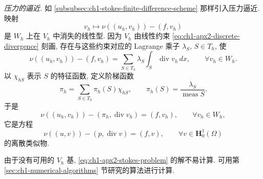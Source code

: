 \emph{压力的逼近.} 如 \ref{subsubsec:ch1-stokes-finite-difference-scheme} 那样引入压力逼近. 映射
\[
v_h\longmapsto\nu((u_h,v_h))-(f,v_h)
\]
是 $W_h$ 上在 $V_h$ 中消失的线性型. 因为 $V_h$ 由线性约束 \eqref{eq:ch1-apx2-discrete-divergence} 刻画, 存在与这些约束对应的 Lagrange 乘子 $\lambda_S$, $S\in T_h$, 使
\begin{equation}
\nu((u_h,v_h))-(f,v_h)
=\sum_{S\in T_h}\lambda_S\int_S\operatorname{div}v_h\,dx,
\qquad\forall v_h\in W_h.
\label{eq:ch1-apx2-pressure-multipliers}
\end{equation}
以 $\chi_{hS}$ 表示 $S$ 的特征函数, 定义阶梯函数
\begin{equation}
\pi_h=\sum_{S\in T_h}\pi_h(S)\chi_{hS},
\qquad
\pi_h(S)=\frac{\lambda_S}{\operatorname{meas}S}.
\label{eq:ch1-apx2-discrete-pressure}
\end{equation}
于是
\begin{equation}
\nu((u_h,v_h))-(\pi_h,\operatorname{div}v_h)
=(f,v_h),\qquad\forall v_h\in W_h,
\label{eq:ch1-apx2-discrete-momentum}
\end{equation}
它是方程
\begin{equation}
\nu((u,v))-(p,\operatorname{div}v)
=(f,v),\qquad\forall v\in\mathbf H_0^1(\Omega)
\label{eq:ch1-continuous-stokes-weak-pressure}
\end{equation}
的离散类似物.

\begin{Remark}
\label{rem:ch1-apx2-computation}
由于没有可用的 $V_h$ 基, \eqref{eq:ch1-apx2-stokes-problem} 的解不易计算. 可用第 \ref{sec:ch1-numerical-algorithms} 节研究的算法进行计算.
\end{Remark}

